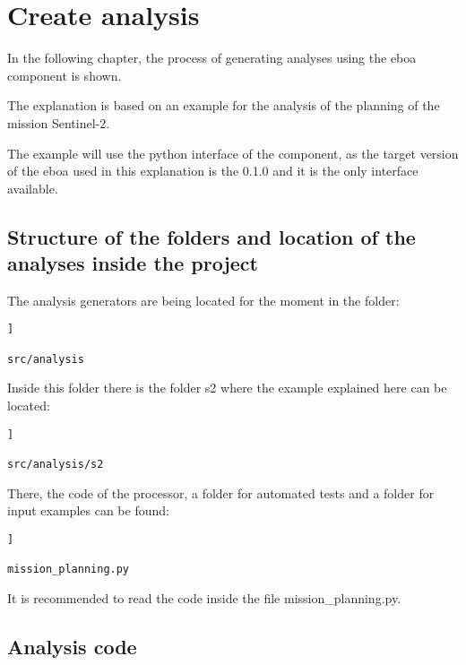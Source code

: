 \chapter{Create analysis}

In the following chapter, the process of generating analyses using the \acrshort{eboa} component is shown.

The explanation is based on an example for the analysis of the planning of the mission Sentinel-2.

The example will use the python interface of the component, as the target version of the \acrshort{eboa} used in this explanation is the 0.1.0 and it is the only interface available.

\section{Structure of the folders and location of the analyses inside the project}

The analysis generators are being located for the moment in the folder:

\begin{lstlisting}[breaklines=true, style=bash]]

src/analysis

\end{lstlisting}

Inside this folder there is the folder s2 where the example explained here can be located:

\begin{lstlisting}[breaklines=true, style=bash]]

src/analysis/s2

\end{lstlisting}

There, the code of the processor, a folder for automated tests and a folder for input examples can be found:

\begin{lstlisting}[breaklines=true, style=bash]]

mission_planning.py

\end{lstlisting}

It is recommended to read the code inside the file mission\_planning.py.

\section{Analysis code}

